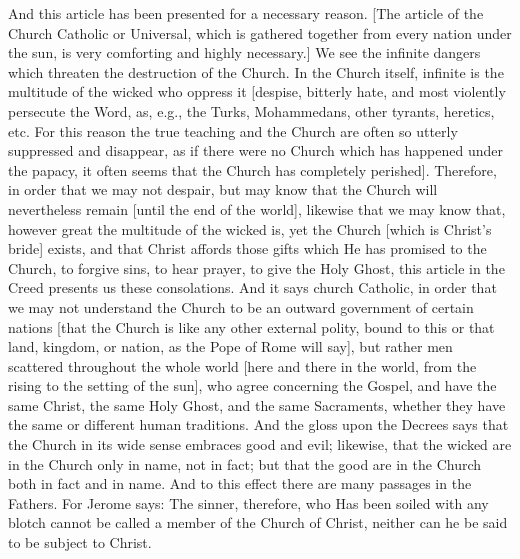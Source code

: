 And this article has been presented for a necessary reason.  [The
article of the Church Catholic or Universal, which is gathered
together from every nation under the sun, is very comforting and
highly necessary.] We see the infinite dangers which threaten the
destruction of the Church.  In the Church itself, infinite is the
multitude of the wicked who oppress it [despise, bitterly hate, and
most violently persecute the Word, as, e.g., the Turks, Mohammedans,
other tyrants, heretics, etc. For this reason the true teaching and
the Church are often so utterly suppressed and disappear, as if there
were no Church which has happened under the papacy, it often seems
that the Church has completely perished].  Therefore, in order that
we may not despair, but may know that the Church will nevertheless
remain [until the end of the world], likewise that we may know that,
however great the multitude of the wicked is, yet the Church [which
is Christ's bride] exists, and that Christ affords those gifts which
He has promised to the Church, to forgive sins, to hear prayer, to
give the Holy Ghost, this article in the Creed presents us these
consolations.  And it says church Catholic, in order that we may not
understand the Church to be an outward government of certain nations
[that the Church is like any other external polity, bound to this or
that land, kingdom, or nation, as the Pope of Rome will say], but
rather men scattered throughout the whole world [here and there in
the world, from the rising to the setting of the sun], who agree
concerning the Gospel, and have the same Christ, the same Holy Ghost,
and the same Sacraments, whether they have the same or different
human traditions.  And the gloss upon the Decrees says that the
Church in its wide sense embraces good and evil; likewise, that the
wicked are in the Church only in name, not in fact; but that the good
are in the Church both in fact and in name.  And to this effect there
are many passages in the Fathers.  For Jerome says: The sinner,
therefore, who Has been soiled with any blotch cannot be called a
member of the Church of Christ, neither can he be said to be subject
to Christ.

